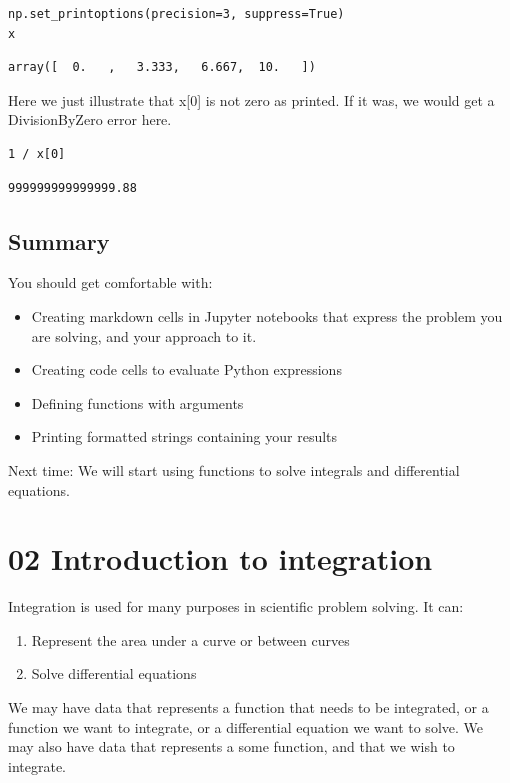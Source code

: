 \documentclass[11pt]{article}
\begin{document}
\begin{verbatim}
np.set_printoptions(precision=3, suppress=True)
x
\end{verbatim}

\begin{verbatim}
array([  0.   ,   3.333,   6.667,  10.   ])
\end{verbatim}

Here we just illustrate that x[0] is not zero as printed. If it was, we would get a DivisionByZero error here.

\begin{verbatim}
1 / x[0]
\end{verbatim}

\begin{verbatim}
999999999999999.88
\end{verbatim}
\subsection{Summary}
\label{sec:org1b68195}

You should get comfortable with:
\begin{itemize}
\item Creating markdown cells in Jupyter notebooks that express the problem you are solving, and your approach to it.
\item Creating code cells to evaluate Python expressions
\item Defining functions with arguments
\item Printing formatted strings containing your results
\end{itemize}

Next time:
We will start using functions to solve integrals and differential equations.

\section{02 Introduction to integration}
\label{sec:orgf66b756}
Integration is used for many purposes in scientific problem solving. It can:

\begin{enumerate}
\item Represent the area under a curve or between curves
\item Solve differential equations
\end{enumerate}

We may have data that represents a function that needs to be integrated, or a function we want to integrate, or a differential equation we want to solve. We may also have data that represents a some function, and that we wish to integrate.
\end{document}
